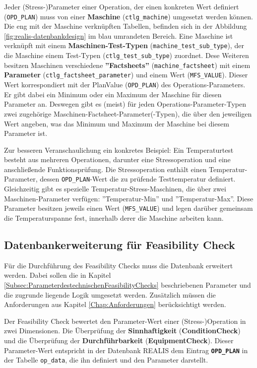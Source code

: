 Jeder (Stress-)Parameter einer Operation, der einen konkreten Wert definiert (\texttt{OPD\_\-PLAN}) muss von einer \textbf{Maschine} (\texttt{ctlg\_machine}) umgesetzt werden können. Die eng mit der Maschine verknüpften Tabellen, befinden sich in der Abbildung \ref{fig:realis-datenbankdesign} im blau umrandeten Bereich. Eine Maschine ist verknüpft mit einem \textbf{Maschinen-Test-Typen} (\texttt{machine\_test\_sub\_type}), der die Maschine einem Test-Typen (\texttt{ctlg\_\-test\_\-sub\_type}) zuordnet. Dese Weiteren besitzen Maschinen verschiedene \textbf{''Fact\-sheets''} (\texttt{machine\_factsheet}) mit einem \textbf{Parameter} (\texttt{ctlg\_factsheet\_parameter}) und einem Wert (\texttt{MFS\_VALUE}). Dieser Wert korrespondiert mit der PlanValue (\texttt{OPD\_PLAN}) des Operations-Parameters. 
Er gibt dabei ein Minimum oder ein Maximum der Maschine für diesen Parameter an. Deswegen gibt es (meist) für jeden Operations-Parameter-Typen zwei zugehörige Maschinen-Factsheet-Parameter(-Typen), die über den jeweiligen Wert angeben, was das Minimum und Maximum der Maschine bei diesem Parameter ist.

Zur besseren Veranschaulichung ein konkretes Beispiel: Ein Temperaturtest besteht aus mehreren Operationen, darunter eine Stressoperation und eine anschließende Funktionsprüfung. Die Stressoperation enthält einen Temperatur-Parameter, dessen \texttt{OPD\_PLAN}-Wert die zu prüfende Testtemperatur definiert. Gleichzeitig gibt es spezielle Temperatur-Stress-Maschinen, die über zwei Maschinen-Parameter verfügen: ''Temperatur-Min'' und ''Temperatur-Max''. Diese Parameter besitzen jeweils einen Wert (\texttt{MFS\_VALUE}) und legen darüber gemeinsam die Temperaturspanne fest, innerhalb derer die Maschine arbeiten kann.


\subsection{Datenbankerweiterung für Feasibility Check}

Für die Durchführung des Feasibility Checks muss die Datenbank erweitert werden. Dabei sollen die in Kapitel \ref{Subsec:ParameterdestechnischenFeasibilityChecks} beschriebenen Parameter und die zugrunde liegende Logik umgesetzt werden. Zusätzlich müssen die Anforderungen aus Kapitel \ref{Chap:Anforderungen} berücksichtigt werden.

Der Feasibility Check bewertet den Parameter-Wert einer (Stress-)Operation in zwei Dimensionen. Die Überprüfung der \textbf{Sinnhaftigkeit} (\textbf{\gls{ConditionCheck}}) und die Überprüfung der \textbf{Durchführbarkeit} (\textbf{\gls{EquipmentCheck}}). 
Dieser Parameter-Wert entspricht in der Datenbank REALIS dem Eintrag \textbf{\texttt{OPD\_PLAN}} in der Tabelle \texttt{op\_data}, die ihn definiert und den Parameter darstellt.

